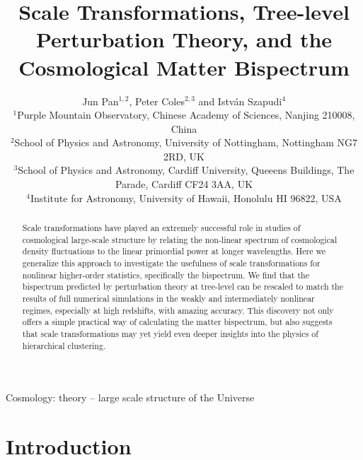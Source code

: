 \documentclass[]{mn2e}
\title[Scale Transformation and the Bispectrum]
{Scale Transformations, Tree-level Perturbation Theory, and the
Cosmological Matter Bispectrum}
\author[Pan, Coles \& Szapudi]{Jun Pan$^{1, 2}$, Peter Coles$^{2,3}$ and Istv\'an Szapudi$^4$
\\$^1$Purple Mountain Observatory, Chinese Academy of Sciences, Nanjing 210008, China
\\$^2$School of Physics and Astronomy, University of Nottingham, Nottingham NG7 2RD, UK
\\$^3$School of Physics and Astronomy, Cardiff University, Queeens
Buildings, The Parade, Cardiff CF24 3AA, UK
\\$^4$Institute for Astronomy, University of Hawaii, Honolulu HI 96822, USA}
\begin{document}
\maketitle


\begin{abstract}
Scale transformations have played an extremely successful role in
studies of cosmological large-scale structure by relating the
non-linear spectrum of cosmological density fluctuations to the
linear primordial power at longer wavelengths. Here we generalize
this approach to investigate the usefulness of scale transformations
for nonlinear higher-order statistics, specifically the bispectrum.
We find that the bispectrum predicted by perturbation theory at
tree-level can be rescaled to match the results of full numerical
simulations in the weakly and intermediately nonlinear regimes,
especially at high redshifts, with amazing accuracy. This discovery
not only offers a simple practical way of calculating the matter
bispectrum, but also suggests that scale transformations may yet
yield even deeper insights into the physics of hierarchical
clustering.
\end{abstract}

\begin{keywords}
Cosmology: theory -- large scale structure of the Universe
\end{keywords}

\section{Introduction}
\end{document}
